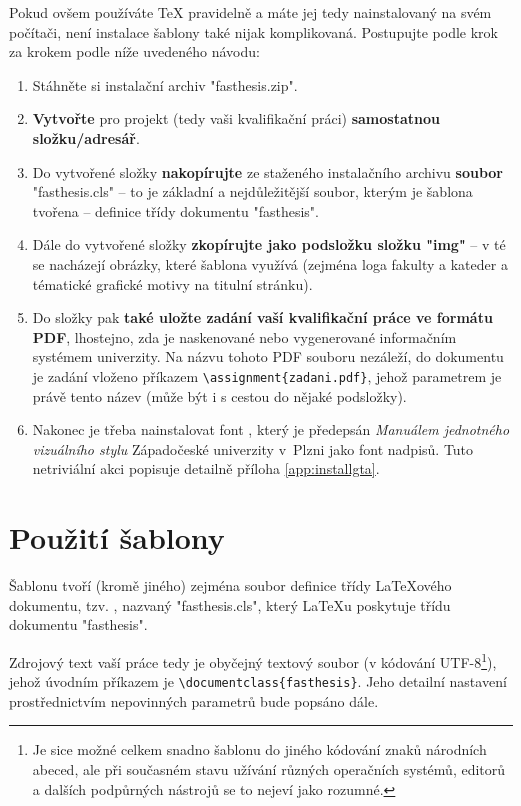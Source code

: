 \documentclass[czech, bc, kiv, he, iso690alph]{fasthesis}
\begin{document}
Pokud ovšem používáte \TeX{} pravidelně a máte jej tedy nainstalovaný na svém počítači, není instalace šablony také nijak komplikovaná. Postupujte podle krok za krokem podle níže uvedeného návodu:
\begin{enumerate}
\item Stáhněte si instalační archiv \filename"fasthesis.zip".
\item \textbf{Vytvořte} pro projekt (tedy vaši kvalifikační práci) \textbf{samostatnou složku/adresář}.
\item Do vytvořené složky \textbf{nakopírujte} ze staženého instalačního archivu \textbf{soubor} \filename"fasthesis.cls" -- to je základní a nejdůležitější soubor, kterým je šablona tvořena -- definice třídy dokumentu \filename"fasthesis".
\item Dále do vytvořené složky \textbf{zkopírujte jako podsložku složku \filename"img"} -- v té se nacházejí obrázky, které šablona využívá (zejména loga fakulty a kateder a tématické grafické motivy na titulní stránku).
\item Do složky pak \textbf{také uložte zadání vaší kvalifikační práce ve formátu PDF}, lhostejno, zda je naskenované nebo vygenerované informačním systémem univerzity. Na názvu tohoto PDF souboru nezáleží, do dokumentu je zadání vloženo příkazem \verb"\assignment{zadani.pdf}", jehož parametrem je právě tento název (může být i s cestou do nějaké podsložky).
\item Nakonec je třeba nainstalovat font , který je předepsán \emph{Manuálem jednotného vizuálního stylu} Západočeské univerzity v~Plzni jako font nadpisů. Tuto netriviální akci popisuje detailně příloha \ref{app:installgta}. 
\end{enumerate}
%
%
%
%
\chapter{Použití šablony}
Šablonu tvoří (kromě jiného) zejména soubor definice třídy \LaTeX{}ového dokumentu, tzv. , nazvaný \filename"fasthesis.cls", který \LaTeX{}u poskytuje třídu dokumentu \filename"fasthesis".

Zdrojový text vaší práce tedy je obyčejný textový soubor (v kódování UTF-8\footnote{Je sice možné celkem snadno šablonu  do jiného kódování znaků národních abeced, ale při současném stavu užívání různých operačních systémů, editorů a dalších podpůrných nástrojů se to nejeví jako rozumné.}), jehož úvodním příkazem je \verb"\documentclass{fasthesis}". Jeho detailní nastavení prostřednictvím nepovinných parametrů bude popsáno dále.
%
%
%
\end{document}

